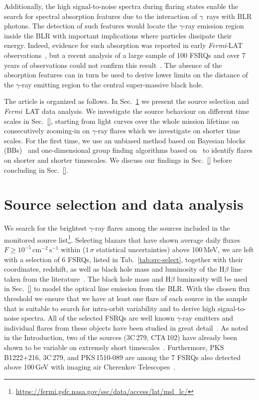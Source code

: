 \documentclass[twocolumn]{aastex62}
\newcommand{\Grays}{$\gamma$~rays\xspace}
\newcommand{\gray}{$\gamma$-ray\xspace}
\newcommand{\FermiLAT}{\emph{Fermi}~LAT\xspace}
\newcommand{\fermiLAT}{\emph{Fermi}-LAT\xspace}
\begin{document}
Additionally, the high signal-to-noise spectra during flaring states enable the search for spectral absorption features due to the interaction of \Grays with BLR photons.
The detection of such features would locate the \gray emission region inside the BLR with important implications where particles dissipate their energy. 
Indeed, evidence for such absorption was reported in early  \fermiLAT observations~\citep{2010ApJ...717L.118P}, but a recent analysis of a large sample of 100 FSRQs and over 7\,years of observations could not confirm this result~\citep{2018MNRAS.477.4749C}.
The absence of the absorption features can in turn be used to derive lower limits on the distance of the \gray emitting region to the central super-massive black hole. 

The article is organized as follows. 
In Sec.~\ref{sec:data} we present the source selection and \FermiLAT data analysis. 
We investigate the source behaviour on different time scales in Sec.~\ref{}, starting from light curves over the whole mission lifetime on consecutively zooming-in on \gray flares which we investigate on shorter time scales. 
For the first time, we use an unbiased method based on Bayesian blocks (BBs)~\citep{2013ApJ...764..167S} and one-dimensional group finding algorithms based on~\citet{1998ApJ...498..137E} to identify flares on shorter and shorter timescales.  
We discuss our findings in Sec.~\ref{}
before concluding in Sec.~\ref{}.

\section{Source selection and data analysis}
\label{sec:data}

We search for the brightest \gray flares among the sources included in the monitored source list\footnote{\url{https://fermi.gsfc.nasa.gov/ssc/data/access/lat/msl_lc/}}. 
Selecting blazars that have shown average daily fluxes $F \geqslant 10^{-5}\,\mathrm{cm}^{-2}\,\mathrm{s}^{-1}$ within ($1\,\sigma$ statistical uncertainties) above 100\,MeV,
we are left with a selection of 6 FSRQs, listed in Tab.~\ref{tab:src-select}, together with their coordinates, redshift, as well as black hole mass and luminosity of the $\mathrm{H}\beta$ line taken from the literature~\citep{2006ApJ...637..669L,2012RMxAA..48....9T}.  
The black hole mass and $\mathrm{H}\beta$ luminosity will be used in Sec.~\ref{} to model the optical line emission from the BLR.
With the chosen flux threshold we ensure that we have at least one flare of each source in the sample that is suitable to search for intra-orbit variability and to derive high signal-to-noise spectra. 
All of the selected FSRQs are well known \gray emitters and individual flares from these objects have been studied in great detail~\citep[e.g.,][]{}. 
As noted in the Introduction, two of the sources (3C\,279, CTA\,102) have already been shown to be variable on extremely short timescales~\citep{TheFermi-LAT:2016dss,2018ApJ...854L..26S}. 
Furthermore, PKS\,B1222+216, 3C\,279, and PKS\,1510-089  are among the 7 FSRQs also detected above 100\,GeV with imaging air Cherenkov Telescopes~\citep{}. 
\end{document}
